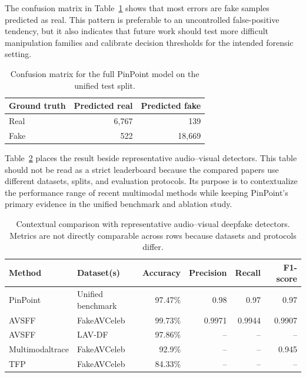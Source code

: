 \documentclass[preprint,12pt,number]{elsarticle}
\begin{document}
The confusion matrix in Table~\ref{tab:confusion} shows that most errors are fake samples predicted as real. This pattern is preferable to an uncontrolled false-positive tendency, but it also indicates that future work should test more difficult manipulation families and calibrate decision thresholds for the intended forensic setting.

\begin{table}[H]
\caption{Confusion matrix for the full PinPoint model on the unified test split.}
\label{tab:confusion}
\centering
\begin{tabular}{lrr}
\toprule
Ground truth & Predicted real & Predicted fake \\
\midrule
Real & 6,767 & 139 \\
Fake & 522 & 18,669 \\
\bottomrule
\end{tabular}
\end{table}

Table~\ref{tab:contextual_comparison} places the result beside representative audio--visual detectors. This table should not be read as a strict leaderboard because the compared papers use different datasets, splits, and evaluation protocols. Its purpose is to contextualize the performance range of recent multimodal methods while keeping PinPoint's primary evidence in the unified benchmark and ablation study.

\begin{table}[H]
\caption{Contextual comparison with representative audio--visual deepfake detectors. Metrics are not directly comparable across rows because datasets and protocols differ.}
\label{tab:contextual_comparison}
\centering
\scriptsize
\setlength{\tabcolsep}{3pt}
\begin{tabularx}{\textwidth}{p{3.3cm}p{2.6cm}rrrr}
\toprule
Method & Dataset(s) & Accuracy & Precision & Recall & F1-score \\
\midrule
PinPoint & Unified benchmark & 97.47\% & 0.98 & 0.97 & 0.97 \\
AVSFF \cite{javed2025avsff} & FakeAVCeleb & 99.73\% & 0.9971 & 0.9944 & 0.9907 \\
AVSFF \cite{javed2025avsff} & LAV-DF & 97.86\% & -- & -- & -- \\
Multimodaltrace \cite{raza2023multimodaltrace} & FakeAVCeleb & 92.9\% & -- & -- & 0.945 \\
TFP \cite{gao2024temporal} & FakeAVCeleb & 84.33\% & -- & -- & -- \\
\bottomrule
\end{tabularx}
\end{table}
\end{document}
